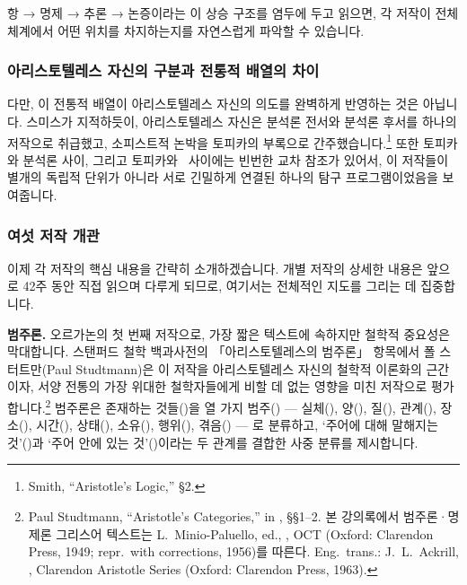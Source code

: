 \documentclass[12pt, a4paper]{article}
\begin{document}
항 → 명제 → 추론 → 논증이라는 이 상승 구조를 염두에 두고 읽으면, 각 저작이 전체 체계에서 어떤 위치를 차지하는지를 자연스럽게 파악할 수 있습니다.

\subsubsection{아리스토텔레스 자신의 구분과 전통적 배열의 차이}

다만, 이 전통적 배열이 아리스토텔레스 자신의 의도를 완벽하게 반영하는 것은 아닙니다. 스미스가 지적하듯이, 아리스토텔레스 자신은 분석론 전서와 분석론 후서를 하나의 저작으로 취급했고, 소피스트적 논박을 토피카의 부록으로 간주했습니다.\footnote{Smith, ``Aristotle's Logic,'' §2.} 또한 토피카와 분석론 사이, 그리고 토피카와 \ 사이에는 빈번한 교차 참조가 있어서, 이 저작들이 별개의 독립적 단위가 아니라 서로 긴밀하게 연결된 하나의 탐구 프로그램이었음을 보여줍니다.

\subsubsection{여섯 저작 개관}

이제 각 저작의 핵심 내용을 간략히 소개하겠습니다. 개별 저작의 상세한 내용은 앞으로 42주 동안 직접 읽으며 다루게 되므로, 여기서는 전체적인 지도를 그리는 데 집중합니다.

\textbf{범주론.} 오르가논의 첫 번째 저작으로, 가장 짧은 텍스트에 속하지만 철학적 중요성은 막대합니다. 스탠퍼드 철학 백과사전의 「아리스토텔레스의 범주론」 항목에서 폴 스터트만(Paul Studtmann)은 이 저작을 아리스토텔레스 자신의 철학적 이론화의 근간이자, 서양 전통의 가장 위대한 철학자들에게 비할 데 없는 영향을 미친 저작으로 평가합니다.\footnote{Paul Studtmann, ``Aristotle's Categories,'' in , §§1--2. 본 강의록에서 범주론·명제론 그리스어 텍스트는 L.\ Minio-Paluello, ed., , OCT (Oxford: Clarendon Press, 1949; repr.\ with corrections, 1956)를 따른다. Eng.\ trans.: J.\ L.\ Ackrill, , Clarendon Aristotle Series (Oxford: Clarendon Press, 1963).} 범주론은 존재하는 것들()을 열 가지 범주() --- 실체(), 양(), 질(), 관계(), 장소(), 시간(), 상태(), 소유(), 행위(), 겪음() --- 로 분류하고, `주어에 대해 말해지는 것'()과 `주어 안에 있는 것'()이라는 두 관계를 결합한 사중 분류를 제시합니다.
\end{document}
